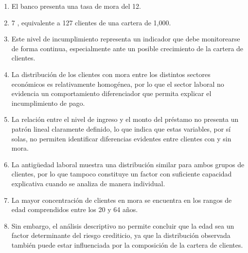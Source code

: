 \begin{enumerate}
    \item El banco presenta una tasa de mora del
12.
    \item 7%
, equivalente a 127 clientes de una cartera de 1,000.
    \item Este nivel de incumplimiento representa un indicador que debe monitorearse de forma continua, especialmente ante un posible crecimiento de la cartera de clientes.
    \item La distribución de los clientes con mora entre los distintos sectores económicos es relativamente homogénea, por lo que el sector laboral no evidencia un comportamiento diferenciador que permita explicar el incumplimiento de pago.
    \item La relación entre el nivel de ingreso y el monto del préstamo no presenta un patrón lineal claramente definido, lo que indica que estas variables, por sí solas, no permiten identificar diferencias evidentes entre clientes con y sin mora.
    \item La antigüedad laboral muestra una distribución similar para ambos grupos de clientes, por lo que tampoco constituye un factor con suficiente capacidad explicativa cuando se analiza de manera individual.
    \item La mayor concentración de clientes en mora se encuentra en los rangos de edad comprendidos entre los
20 y 64 años.
    \item Sin embargo, el análisis descriptivo no permite concluir que la edad sea un factor determinante del riesgo crediticio, ya que la distribución observada también puede estar influenciada por la composición de la cartera de clientes.
\end{enumerate}

